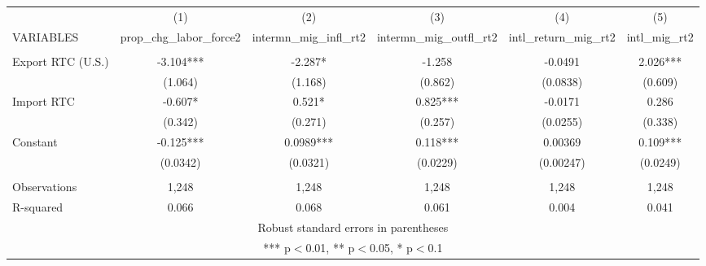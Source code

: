 \begin{tabular}{lccccc} \hline
 & (1) & (2) & (3) & (4) & (5) \\
VARIABLES & prop\_chg\_labor\_force2 & intermn\_mig\_infl\_rt2 & intermn\_mig\_outfl\_rt2 & intl\_return\_mig\_rt2 & intl\_mig\_rt2 \\ \hline
 &  &  &  &  &  \\
Export RTC (U.S.) & -3.104*** & -2.287* & -1.258 & -0.0491 & 2.026*** \\
 & (1.064) & (1.168) & (0.862) & (0.0838) & (0.609) \\
Import RTC & -0.607* & 0.521* & 0.825*** & -0.0171 & 0.286 \\
 & (0.342) & (0.271) & (0.257) & (0.0255) & (0.338) \\
Constant & -0.125*** & 0.0989*** & 0.118*** & 0.00369 & 0.109*** \\
 & (0.0342) & (0.0321) & (0.0229) & (0.00247) & (0.0249) \\
 &  &  &  &  &  \\
Observations & 1,248 & 1,248 & 1,248 & 1,248 & 1,248 \\
 R-squared & 0.066 & 0.068 & 0.061 & 0.004 & 0.041 \\ \hline
\multicolumn{6}{c}{ Robust standard errors in parentheses} \\
\multicolumn{6}{c}{ *** p$<$0.01, ** p$<$0.05, * p$<$0.1} \\
\end{tabular}
